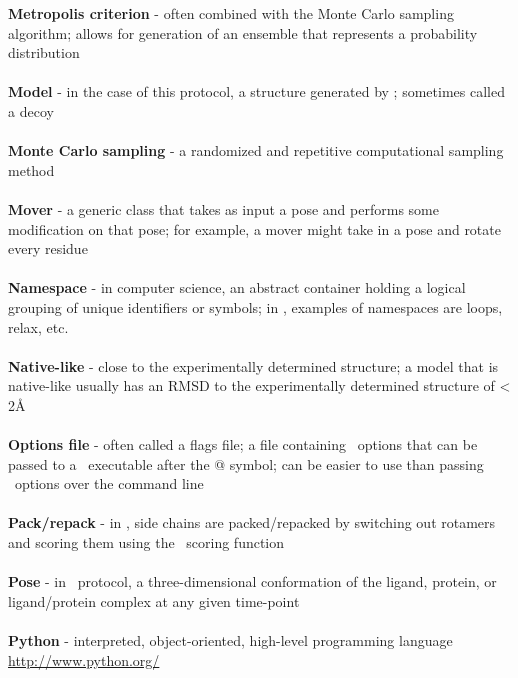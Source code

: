 \textbf{Metropolis criterion} - often combined with the Monte Carlo sampling algorithm; allows for generation of an ensemble that represents a probability distribution \\ \\

\textbf{Model} - in the case of this protocol, a structure generated by \rosetta; sometimes called a decoy \\ \\

\textbf{Monte Carlo sampling} - a randomized and repetitive computational sampling method \\ \\

\textbf{Mover} - a generic class that takes as input a pose and performs some modification on that pose; for example, a mover might take in a pose and rotate every residue \\ \\

\textbf{Namespace} - in computer science, an abstract container holding a logical grouping of unique identifiers or symbols; in \rosetta, examples of namespaces are loops, relax, etc. \\ \\

\textbf{Native-like} - close to the experimentally determined structure; a model that is native-like usually has an RMSD to the experimentally determined structure of < 2\r{A} \\ \\

\textbf{Options file} - often called a flags file; a file containing \rosetta~options that can be passed to a \rosetta~executable after the @ symbol; can be easier to use than passing \rosetta~options over the command line \\ \\

\textbf{Pack/repack} - in \rosetta, side chains are packed/repacked by switching out rotamers and scoring them using the \rosetta~scoring function \\ \\

\textbf{Pose} - in  \rosetta~protocol, a three-dimensional conformation of the ligand, protein, or ligand/protein complex at any given time-point \\ \\

\textbf{Python} - interpreted, object-oriented, high-level programming language \url{http://www.python.org/} \\ \\

